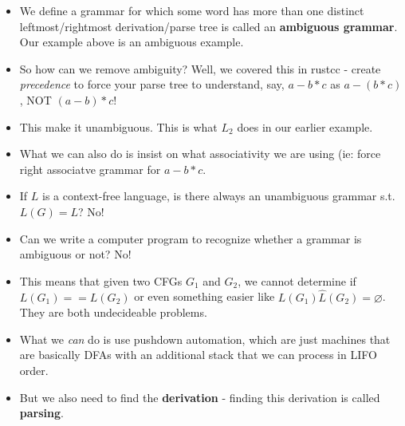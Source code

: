 \documentclass[12pt]{article}
\begin{document}
\begin{itemize}
    \item We define a grammar for which some word has more than one distinct leftmost/rightmost derivation/parse tree is called an \textbf{ambiguous grammar}.  Our example above is an ambiguous example.
    \item So how can we remove ambiguity?  Well, we covered this in rustcc - create \emph{precedence} to force your parse tree to understand, say, $a - b * c$ as $a - (b * c)$, NOT $(a - b) * c$!
    \item This make it unambiguous.  This is what $L_2$ does in our earlier example.
    \item What we can also do is insist on what associativity we are using (ie: force right associatve grammar for $a - b * c$.
    \item If $L$ is a context-free language, is there always an unambiguous grammar s.t. $L(G) = L$?  No!  
    \item Can we write a computer program to recognize whether a grammar is ambiguous or not?  No!
    \item This means that given two CFGs $G_1$ and $G_2$, we cannot determine if $L(G_1) == L(G_2)$ or even something easier like $L(G_1) \hat L(G_2) = \varnothing$.  They are both undecideable problems.
    \item What we \emph{can} do is use pushdown automation, which are just machines that are basically DFAs with an additional stack that we can process in LIFO order.  
    \item But we also need to find the \textbf{derivation} - finding this derivation is called \textbf{parsing}.
\end{itemize}
\end{document}
